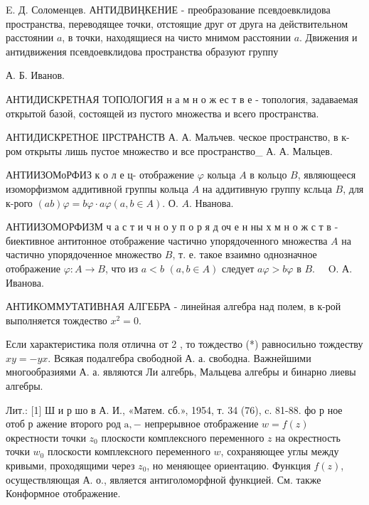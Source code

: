 \documentclass[10pt]{article}
\begin{document}
E. Д. Соломенцев. АНТИДВИҢКЕНИЕ - преобразование псевдоевклидова пространства, переводящее точки, отстоящие друг от друга на действительном расстоянии $a$, в точки, находящиеся на чисто мнимом расстоянии $a$. Движения и антидвижения псевдоевклидова пространства образуют группу



А. Б. Иванов.



АНТИДИСКРЕТНАЯ ТОПОЛОГИЯ н а м н о ж ес т в е - топология, задаваемая открытой базой, состоящей из пустого множества и всего пространства.



АНТИДИСКРЕТНОЕ ІІРСТРАНСТВ А. А. Малъчев. ческое пространство, в к-ром открыты лишь пустое множество и все пространство\_ А. А. Мальцев.



АНТИИЗОМоРФИЗ к о л е ц- отображение $\varphi$ кольца $A$ в кольцо $B$, являющееся изоморфизмом аддитивной группы кольца $A$ на аддитивную группу ксльца $B$, для к-рого $(a b) \varphi=b \varphi \cdot a \varphi(a, b \in A)$. О. $A$. Нванова.



АНТИИЗОМОРФИЗМ ч а с т и ч н о у п о р я д оч е н ны х м н о ж с т в - биективное антитонное отображение частично упорядоченного множества $A$ на частично упорядоченное множество $B$, т. е. такое взаимно однозначное отображение $\varphi: A \rightarrow B$, что из $a<b$ $(a, b \in A)$ следует $a \varphi>b \varphi$ в $B . \quad$ O. А. Иванова.



АНТИКОММУТАТИВНАЯ АЛГЕБРА - линейная алгебра над полем, в к-рой выполняется тождество $x^{2}=0$.



Если характеристика поля отлична от 2 , то тождество (*) равносильно тождеству $x y=-y x$. Всякая подалгебра свободной А. а. свободна. Важнейшими многообразиями А. а. являются Ли алгебрь, Мальцева алгебры и бинарно лиевы алгебры.



Лит.: [1] Ш и р шо в А. И., «Матем. сб.», 1954, т. 34 (76), c. 81-88. фо р ное отоб р ажение второго род $\mathrm{a},-$ непрерывное отображение $w=f(z)$ окрестности точки $z_{0}$ плоскости комплексного переменного $z$ на окрестность точки $w_{0}$ плоскости комплексного переменного $w$, сохраняющее углы между кривыми, проходящими через $z_{0}$, но меняющее ориентацию. Функция $f(z)$, осуществляющая А. о., является антиголоморфной функцией. См. также Конформное отображение.
\end{document}
